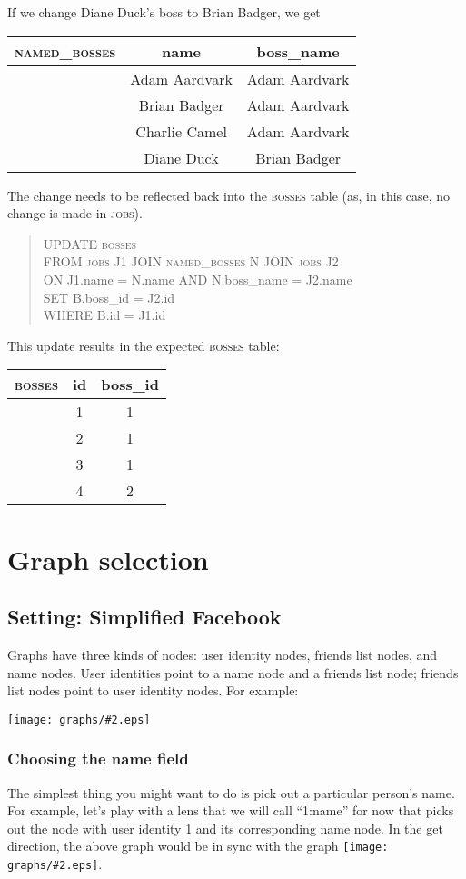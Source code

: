 \documentclass{article}
\newcommand{\scaledgraph}[2]{\texttt{[image: graphs/\#2.eps]}}
\newcommand{\graph}[1]{\scaledgraph{0.5}{#1}}
\newcommand{\centeredgraph}[1]{\begin{center}\graph{#1}\end{center}}
\newcommand{\inlinegraph}[1]{\scaledgraph{0.2}{#1}}
\begin{document}
If we change Diane Duck's boss to Brian Badger, we get
\begin{center} \begin{tabular} {c | c c }
    \textsc{named\_bosses} & name & boss\_name \\
    \hline
    & Adam Aardvark & Adam Aardvark \\
    & Brian Badger & Adam Aardvark \\
    & Charlie Camel & Adam Aardvark \\
    & Diane Duck & Brian Badger
\end{tabular} \end{center}
The change needs to be reflected back into the \textsc{bosses}
table (as, in this case, no change is made in \textsc{jobs}).
\begin{quote}
    UPDATE \textsc{bosses} \\
    FROM \textsc{jobs} J1 JOIN \textsc{named\_bosses} N JOIN \textsc{jobs} J2 \\
    ON J1.name = N.name AND N.boss\_name = J2.name \\
    SET B.boss\_id = J2.id \\
    WHERE B.id = J1.id
\end{quote}
This update results in the expected \textsc{bosses} table:
\begin{center} \begin{tabular} {c | c c }
    \textsc{bosses} & id & boss\_id \\
    \hline
    & 1 & 1 \\
    & 2 & 1 \\
    & 3 & 1 \\
    & 4 & 2 
\end{tabular} \end{center}


\section{Graph selection}
\subsection*{Setting: Simplified Facebook}
Graphs have three kinds of nodes: user identity nodes, friends list nodes,
and name nodes. User identities point to a name node and a friends list
node; friends list nodes point to user identity nodes. For example:

\centeredgraph{facebook-start}

\subsubsection*{Choosing the name field}
The simplest thing you might want to do is pick out a particular person's
name. For example, let's play with a lens that we will call ``1:name'' for
now that picks out the node with user identity 1 and its corresponding name
node. In the get direction, the above graph would be in sync with the graph
\inlinegraph{facebook-name-dw}.
\end{document}
